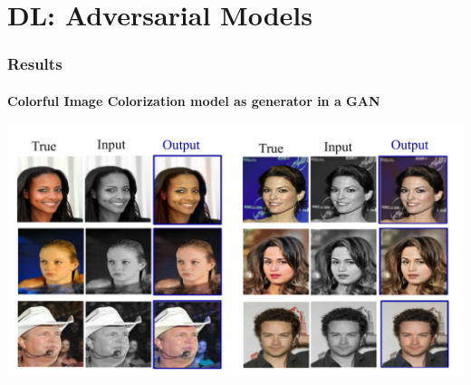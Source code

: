 \documentclass{beamer}
\begin{document}
\section*{DL: Adversarial Models}
\begin{frame}
\frametitle{\textbf{Results}}
\framesubtitle{\textbf{Colorful Image Colorization model as generator in a GAN}}
\includegraphics[width=\linewidth]{82.pdf}
\end{frame}
\end{document}
